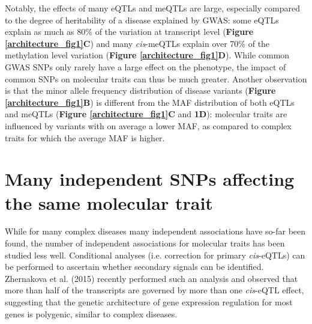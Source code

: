 Notably, the effects of many eQTLs and meQTLs are large, especially compared to the degree of heritability of a disease explained by GWAS: some eQTLs explain as much as 80\% of the variation at transcript level (\textbf{Figure \ref{architecture_fig1}C}) and many \emph{cis}-meQTLs explain over 70\% of the methylation level variation (\textbf{Figure \ref{architecture_fig1}D}). While common GWAS SNPs only rarely have a large effect on the phenotype, the impact of common SNPs on molecular traits can thus be much greater. 
Another observation is that the minor allele frequency distribution of disease variants (\textbf{Figure \ref{architecture_fig1}B}) is different from the MAF distribution of both eQTLs and meQTLs (\textbf{Figure \ref{architecture_fig1}C} and \textbf{1D}): molecular traits are influenced by variants with on average a lower MAF, as compared to complex traits for which the average MAF is higher.

\section{Many independent SNPs affecting the same molecular trait}
While for many complex diseases many independent associations have so-far been found, the number of independent associations for molecular traits has been studied less well. Conditional analyses (i.e. correction for primary \emph{cis}-eQTLs) can be performed to ascertain whether secondary signals can be identified. Zhernakova et al. (2015) recently performed such an analysis and observed that more than half of the transcripts are governed by more than one \emph{cis}-eQTL effect, suggesting that the genetic architecture of gene expression regulation for most genes is polygenic, similar to complex diseases.

